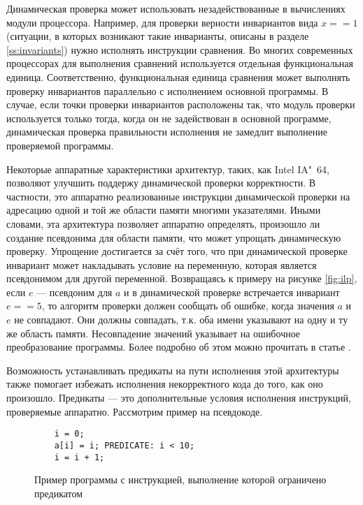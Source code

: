 Динамическая проверка может использовать незадействованные в вычислениях модули процессора. Например, для проверки верности инвариантов вида $x == 1$ (ситуации, в которых возникают такие инварианты, описаны в разделе \ref{ss:invariants}) нужно исполнять инструкции сравнения. Во многих современных процессорах для выполнения сравнений используется отдельная функциональная единица. Соответственно, функциональная единица сравнения может выполнять проверку инвариантов параллельно с исполнением основной программы. В случае, если точки проверки инвариантов расположены так, что модуль проверки используется только тогда, когда он не задействован в основной программе, динамическая проверка правильности исполнения не замедлит выполнение проверяемой программы.

Некоторые аппаратные характеристики архитектур, таких, как Intel IA"~64, позволяют улучшить поддержу динамической проверки корректности. В частности, это аппаратно реализованные инструкции динамической проверки на адресацию одной и той же области памяти многими указателями. Иными словами, эта архитектура позволяет аппаратно определять, произошло ли создание псевдонима для области памяти, что может упрощать динамическую проверку. Упрощение достигается за счёт того, что при динамической проверке инвариант может накладывать условие на переменную, которая является псевдонимом для другой переменной. Возвращаясь к примеру на рисунке \ref{fig:ilp}, если $e$ --- псевдоним для $a$ и в динамической проверке встречается инвариант $e == 5$, то алгоритм проверки должен сообщать об ошибке, когда значения $a$ и $e$ не совпадают. Они должны совпадать, т.к. оба имени указывают на одну и ту же область памяти. Несовпадение значений указывает на ошибочное преобразование программы. Более подробно об этом можно прочитать в статье \cite{GHCP02}.

Возможность устанавливать предикаты на пути исполнения этой архитектуры также помогает избежать исполнения некорректного кода до того, как оно произошло. Предикаты --- это дополнительные условия исполнения инструкций, проверяемые аппаратно. Рассмотрим пример на псевдокоде.

\begin{figure}[H]
    \begin{verbatim}
    i = 0;
    a[i] = i; PREDICATE: i < 10;
    i = i + 1;
    \end{verbatim}
    \caption{Пример программы с инструкцией, выполнение которой ограничено предикатом}
    \label{fig:predicate}
\end{figure}

